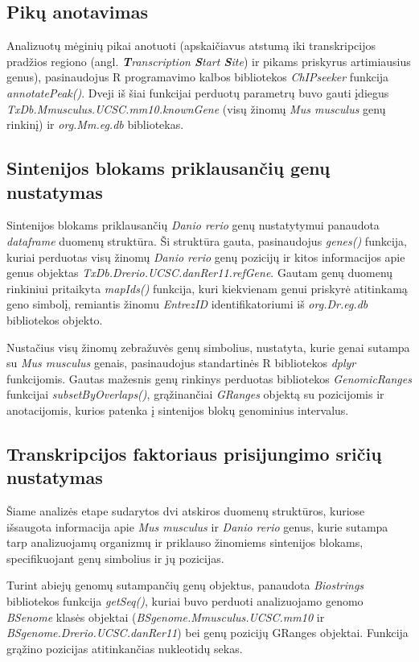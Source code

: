 \documentclass[12pt]{article}
\begin{document}
\subsection{Pikų anotavimas}
Analizuotų mėginių pikai anotuoti (apskaičiavus atstumą iki transkripcijos
pradžios regiono (angl. \emph{\textbf{T}ranscription \textbf{S}tart
\textbf{S}ite}) ir pikams priskyrus artimiausius genus), pasinaudojus R
programavimo kalbos bibliotekos \emph{ChIPseeker}\cite{CHIP1, CHIP2} funkcija
\emph{annotatePeak()}. Dveji iš šiai funkcijai perduotų parametrų buvo gauti
įdiegus \emph{TxDb.Mmusculus.UCSC.mm10.knownGene}\cite{KNOWN_GENE} (visų žinomų
\emph{Mus musculus} genų rinkinį) ir \emph{org.Mm.eg.db}\cite{MM_ANNOT}
bibliotekas.

\subsection{Sintenijos blokams priklausančių genų nustatymas}
Sintenijos blokams priklausančių \emph{Danio rerio} genų nustatytymui panaudota
\emph{dataframe} duomenų struktūra. Ši struktūra gauta, pasinaudojus
\emph{genes()} funkcija, kuriai perduotas visų žinomų \emph{Danio rerio} genų
pozicijų ir kitos informacijos apie genus objektas
\emph{TxDb.Drerio.UCSC.danRer11.refGene}. Gautam genų duomenų rinkiniui
pritaikyta \emph{mapIds()} funkcija, kuri kiekvienam genui priskyrė atitinkamą
geno simbolį, remiantis žinomu \emph{EntrezID} identifikatoriumi iš
\emph{org.Dr.eg.db} bibliotekos objekto.

Nustačius visų žinomų zebražuvės genų simbolius, nustatyta, kurie genai sutampa
su \emph{Mus musculus} genais, pasinaudojus standartinės R bibliotekos
\emph{dplyr} funkcijomis. Gautas mažesnis genų rinkinys perduotas bibliotekos
\emph{GenomicRanges} funkcijai \emph{subsetByOverlaps()}, grąžinančiai
\emph{GRanges} objektą su pozicijomis ir anotacijomis, kurios patenka į
sintenijos blokų genominius intervalus.

\subsection{Transkripcijos faktoriaus prisijungimo sričių nustatymas}
Šiame analizės etape sudarytos dvi atskiros duomenų struktūros, kuriose
išsaugota informacija apie \emph{Mus musculus} ir \emph{Danio rerio} genus,
kurie sutampa tarp analizuojamų organizmų ir priklauso žinomiems sintenijos
blokams, specifikuojant genų simbolius ir jų pozicijas.

Turint abiejų genomų sutampančių genų objektus, panaudota \emph{Biostrings}
bibliotekos funkcija \emph{getSeq()}, kuriai buvo perduoti analizuojamo genomo
\emph{BSenome} klasės objektai (\emph{BSgenome.Mmusculus.UCSC.mm10} ir
\emph{BSgenome.Drerio.UCSC.danRer11}) bei genų pozicijų GRanges objektai.
Funkcija grąžino pozicijas atitinkančias nukleotidų sekas.
\end{document}

